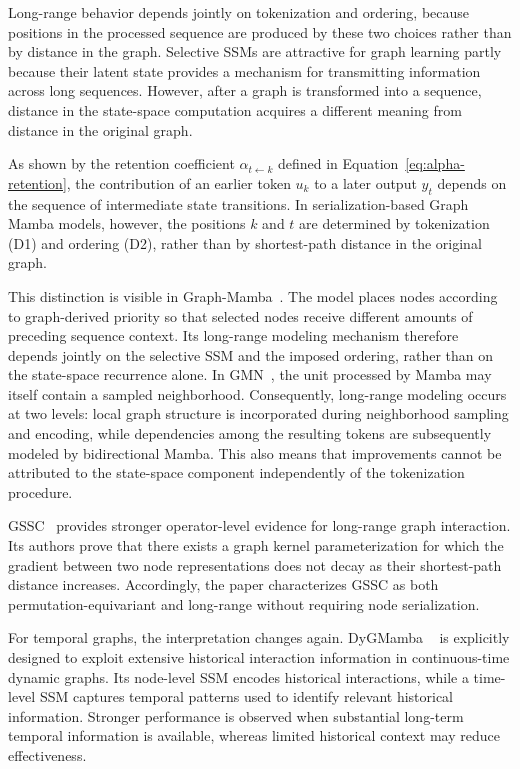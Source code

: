 \documentclass[acmsmall]{acmart}
\begin{document}
Long-range behavior depends jointly on tokenization and ordering, because positions in the processed sequence are produced by these two choices rather than by distance in the graph. Selective SSMs are attractive for graph learning partly because their latent state provides a mechanism for transmitting information across long sequences. However, after a graph is transformed into a sequence, distance in the state-space computation acquires a different meaning from distance in the original graph.

As shown by the retention coefficient $\alpha_{t\leftarrow k}$ defined in
Equation~\eqref{eq:alpha-retention}, the contribution of an earlier token
$u_k$ to a later output $y_t$ depends on the sequence of intermediate
state transitions. In serialization-based Graph Mamba models, however, the
positions $k$ and $t$ are determined by tokenization (D1) and ordering (D2),
rather than by shortest-path distance in the original graph.

This distinction is visible in Graph-Mamba~\cite{wang2024graph}. The model
places nodes according to graph-derived priority so that selected nodes receive
different amounts of preceding sequence context. Its long-range modeling
mechanism therefore depends jointly on the selective SSM and the imposed
ordering, rather than on the state-space recurrence alone.
In GMN~\cite{behrouz2024graph}, the unit processed by Mamba may itself contain
a sampled neighborhood. Consequently, long-range modeling occurs at two
levels: local graph structure is incorporated during neighborhood sampling and
encoding, while dependencies among the resulting tokens are subsequently
modeled by bidirectional Mamba. This also means that improvements cannot be
attributed to the state-space component independently of the tokenization
procedure.

GSSC~\cite{huang2024can} provides stronger operator-level evidence for
long-range graph interaction. Its authors prove that there exists a graph
kernel parameterization for which the gradient between two node
representations does not decay as their shortest-path distance increases.
Accordingly, the paper characterizes GSSC as both permutation-equivariant and
long-range without requiring node serialization.

For temporal graphs, the interpretation changes again. DyGMamba
~\cite{ding2024dygmamba} is explicitly designed to exploit extensive historical
interaction information in continuous-time dynamic graphs. Its node-level SSM
encodes historical interactions, while a time-level SSM captures temporal
patterns used to identify relevant historical information. Stronger performance is observed when substantial long-term temporal information is available, whereas limited historical context may reduce effectiveness.
\end{document}
